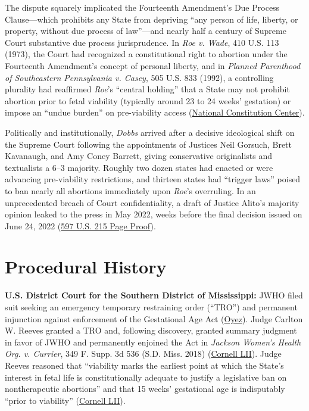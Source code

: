 \documentclass[12pt]{article}
\begin{document}
The dispute squarely implicated the Fourteenth Amendment's Due Process Clause---which prohibits any State from depriving ``any person of life, liberty, or property, without due process of law''---and nearly half a century of Supreme Court substantive due process jurisprudence. In \textit{Roe v. Wade}, 410 U.S. 113 (1973), the Court had recognized a constitutional right to abortion under the Fourteenth Amendment's concept of personal liberty, and in \textit{Planned Parenthood of Southeastern Pennsylvania v. Casey}, 505 U.S. 833 (1992), a controlling plurality had reaffirmed \textit{Roe}'s ``central holding'' that a State may not prohibit abortion prior to fetal viability (typically around 23 to 24 weeks' gestation) or impose an ``undue burden'' on pre-viability access (\href{https://constitutioncenter.org/the-constitution/supreme-court-case-library/dobbs-v-jackson-womens-health-organization}{National Constitution Center}).

Politically and institutionally, \textit{Dobbs} arrived after a decisive ideological shift on the Supreme Court following the appointments of Justices Neil Gorsuch, Brett Kavanaugh, and Amy Coney Barrett, giving conservative originalists and textualists a 6--3 majority. Roughly two dozen states had enacted or were advancing pre-viability restrictions, and thirteen states had ``trigger laws'' poised to ban nearly all abortions immediately upon \textit{Roe}'s overruling. In an unprecedented breach of Court confidentiality, a draft of Justice Alito's majority opinion leaked to the press in May 2022, weeks before the final decision issued on June 24, 2022 (\href{https://www.supremecourt.gov/opinions/21pdf/597us1r58_gebh.pdf}{597 U.S. 215 Page Proof}).

\section{Procedural History}

\textbf{U.S. District Court for the Southern District of Mississippi:} JWHO filed suit seeking an emergency temporary restraining order (``TRO'') and permanent injunction against enforcement of the Gestational Age Act (\href{https://www.oyez.org/cases/2021/19-1392}{Oyez}). Judge Carlton W. Reeves granted a TRO and, following discovery, granted summary judgment in favor of JWHO and permanently enjoined the Act in \textit{Jackson Women's Health Org. v. Currier}, 349 F. Supp. 3d 536 (S.D. Miss. 2018) (\href{https://www.law.cornell.edu/supremecourt/text/19-1392}{Cornell LII}). Judge Reeves reasoned that ``viability marks the earliest point at which the State's interest in fetal life is constitutionally adequate to justify a legislative ban on nontherapeutic abortions'' and that 15 weeks' gestational age is indisputably ``prior to viability'' (\href{https://www.law.cornell.edu/supremecourt/text/19-1392}{Cornell LII}).
\end{document}
